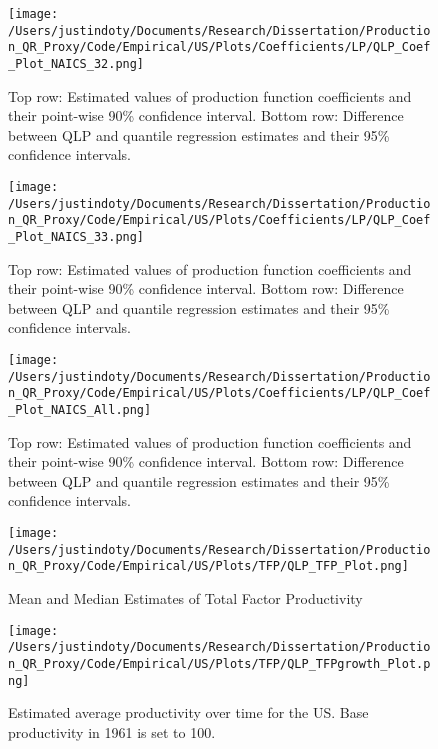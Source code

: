 \documentclass[11pt]{article}
\begin{document}
\begin{figure}[H]
\centering
\texttt{[image: /Users/justindoty/Documents/Research/Dissertation/Production\_QR\_Proxy/Code/Empirical/US/Plots/Coefficients/LP/QLP\_Coef\_Plot\_NAICS\_32.png]}
\caption{Top row: Estimated values of production function coefficients and their point-wise 90\% confidence interval. Bottom row: Difference between QLP and quantile regression estimates and their 95\% confidence intervals.}
\label{fig:32coef}
\end{figure}

\begin{figure}[H]
\centering
\texttt{[image: /Users/justindoty/Documents/Research/Dissertation/Production\_QR\_Proxy/Code/Empirical/US/Plots/Coefficients/LP/QLP\_Coef\_Plot\_NAICS\_33.png]}
\caption{Top row: Estimated values of production function coefficients and their point-wise 90\% confidence interval. Bottom row: Difference between QLP and quantile regression estimates and their 95\% confidence intervals.}
\label{fig:33coef}
\end{figure}

\begin{figure}[H]
\centering
\texttt{[image: /Users/justindoty/Documents/Research/Dissertation/Production\_QR\_Proxy/Code/Empirical/US/Plots/Coefficients/LP/QLP\_Coef\_Plot\_NAICS\_All.png]}
\caption{Top row: Estimated values of production function coefficients and their point-wise 90\% confidence interval. Bottom row: Difference between QLP and quantile regression estimates and their 95\% confidence intervals.}
\label{fig:USallcoef}
\end{figure}

\begin{figure}[H]
\centering
\caption{Mean and Median Estimates of Total Factor Productivity}
\texttt{[image: /Users/justindoty/Documents/Research/Dissertation/Production\_QR\_Proxy/Code/Empirical/US/Plots/TFP/QLP\_TFP\_Plot.png]}
\label{fig:LPUSTFPDens}
\end{figure}

\begin{figure}[H]
\centering
\texttt{[image: /Users/justindoty/Documents/Research/Dissertation/Production\_QR\_Proxy/Code/Empirical/US/Plots/TFP/QLP\_TFPgrowth\_Plot.png]}
\caption{Estimated average productivity over time for the US. Base productivity in 1961 is set to 100.}
\label{fig:USpgrowth}
\end{figure}
\end{document}
